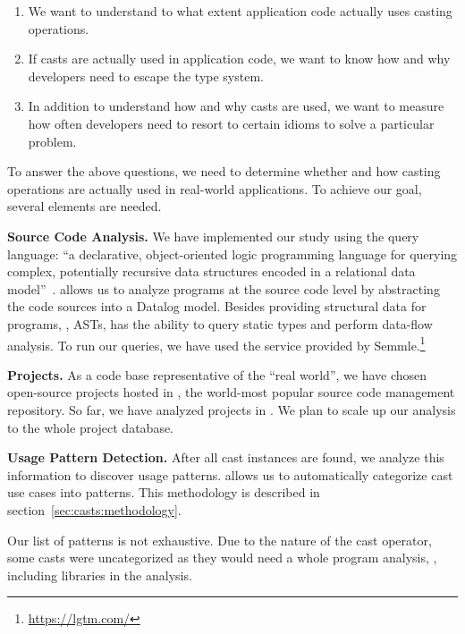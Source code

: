 \begin{enumerate}[label=$CRQ\arabic*:$,ref=$CRQ\arabic*$,leftmargin=3.4\parindent]
\item\label{enum:rq1}{\bf \crqA}
We want to understand to what extent application code actually uses casting operations.
\item\label{enum:rq2}{\bf \crqB}
If casts are actually used in application code, we want to know how and why developers need to escape the type system.
\item\label{enum:rq3}{\bf \crqC}
In addition to understand how and why casts are used, we want to measure how often developers need to resort to certain idioms to solve a particular problem.
\end{enumerate}

To answer the above questions, we need to determine whether and how casting operations are actually used in real-world \java{} applications.
To achieve our goal, several elements are needed.

\textbf{Source Code Analysis.}
We have implemented our study using the \ql{} query language:
``a declarative, object-oriented logic programming language for querying complex, potentially recursive data structures encoded in a relational data model''~\citep{avgustinovQLObjectorientedQueries2016}.
\ql{} allows us to analyze programs at the source code level by abstracting the code sources into a Datalog model.
Besides providing structural data for programs, \ie{}, ASTs,
\ql{} has the ability to query static types and perform data-flow analysis.
To run our \ql{} queries, we have used the service provided by Semmle.\footnote{\url{https://lgtm.com/}} 

\textbf{Projects.} 
As a code base representative of the ``real world'',
we have chosen open-source projects hosted in 
\github{},
the world-most popular source code management repository.
So far, we have analyzed \nproject{} \java{} projects in \lgtm{}.
We plan to scale up our analysis to the whole \lgtm{} project database.

\textbf{Usage Pattern Detection.}
After all cast instances are found, we analyze this information to discover usage patterns.
\ql{} allows us to automatically categorize cast use cases into patterns.
This methodology is described in section~\ref{sec:casts:methodology}.

Our list of patterns is not exhaustive.
Due to the nature of the cast operator, some casts were uncategorized as they would need a whole program analysis, \eg{}, including libraries in the analysis.

